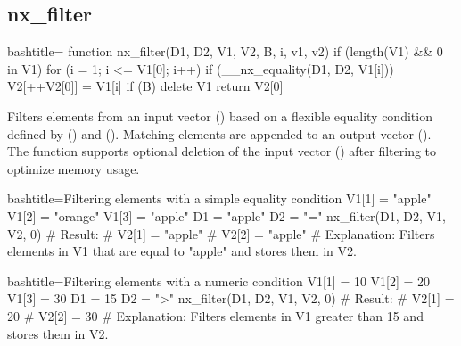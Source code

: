 \newpage
\subsection{nx_filter}
\label{nx_filter}
\begin{NexCodeBox}{bash}{title={}}
function nx_filter(D1, D2, V1, V2, B,   i, v1, v2)
{
	if (length(V1) && 0 in V1) {
		for (i = 1; i <= V1[0]; i++) {
			if (__nx_equality(D1, D2, V1[i]))
				V2[++V2[0]] = V1[i]
		}
		if (B)
			delete V1
		return V2[0]
	}
}
\end{NexCodeBox}

\begin{NexMainBox}
	\begin{NexMainBox}
		Filters elements from an input vector () based on a flexible equality condition defined by () and (). Matching elements are appended to an output vector (). The function supports optional deletion of the input vector () after filtering to optimize memory usage.
	\end{NexMainBox}
	\begin{NexMainBox}
		\begin{NexListDark}
		\end{NexListDark}
	\end{NexMainBox}
\end{NexMainBox}

\begin{NexCodeBox}{bash}{title={Filtering elements with a simple equality condition}}
	V1[1] = "apple"
	V1[2] = "orange"
	V1[3] = "apple"
	D1 = "apple"
	D2 = "="
	nx_filter(D1, D2, V1, V2, 0)
	# Result:
	# V2[1] = "apple"
	# V2[2] = "apple"
	# Explanation: Filters elements in V1 that are equal to "apple" and stores them in V2.
\end{NexCodeBox}

\begin{NexCodeBox}{bash}{title={Filtering elements with a numeric condition}}
	V1[1] = 10
	V1[2] = 20
	V1[3] = 30
	D1 = 15
	D2 = ">"
	nx_filter(D1, D2, V1, V2, 0)
	# Result:
	# V2[1] = 20
	# V2[2] = 30
	# Explanation: Filters elements in V1 greater than 15 and stores them in V2.
\end{NexCodeBox}

